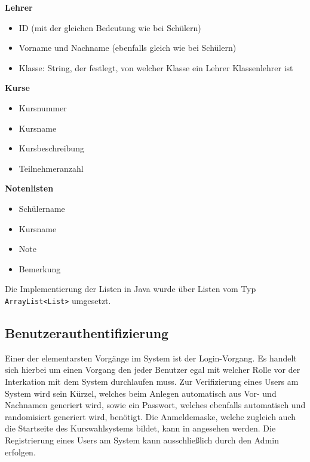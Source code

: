 \documentclass[12pt, twoside, a4paper, ngerman]{article}
\begin{document}
\textbf{Lehrer}
\begin{itemize}
  \item ID (mit der gleichen Bedeutung wie bei Schülern)
  \item Vorname und Nachname (ebenfalls gleich wie bei Schülern)
  \item Klasse: String, der festlegt, von welcher Klasse ein Lehrer Klassenlehrer ist
\end{itemize}

\textbf{Kurse}
\begin{itemize}
  \item Kursnummer
  \item Kursname
  \item Kursbeschreibung
  \item Teilnehmeranzahl
\end{itemize}

\textbf{Notenlisten}
\begin{itemize}
  \item Schülername
  \item Kursname
  \item Note
  \item Bemerkung
\end{itemize}

Die Implementierung der Listen in Java wurde über Listen vom Typ \texttt{ArrayList<List>} umgesetzt. 


\subsection{Benutzerauthentifizierung}

Einer der elementarsten Vorgänge im System ist der Login-Vorgang. Es handelt sich hierbei um einen Vorgang den jeder Benutzer egal mit welcher Rolle vor der Interkation mit dem System durchlaufen muss. Zur Verifizierung eines Users am System wird sein Kürzel, welches beim Anlegen automatisch aus Vor- und Nachnamen generiert wird, sowie ein Passwort, welches ebenfalls automatisch und randomisiert generiert wird, benötigt. Die Anmeldemaske, welche zugleich auch die Startseite des Kurswahlsystems bildet, kann in  angesehen werden. Die Registrierung eines Users am System kann ausschließlich durch den Admin erfolgen.
\end{document}
